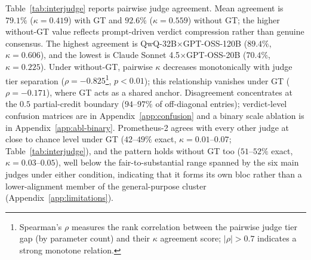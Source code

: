 Table~\ref{tab:interjudge} reports pairwise judge agreement. Mean agreement is $79.1\%$ ($\kappa=0.419$) with GT and $92.6\%$ ($\kappa=0.559$) without GT; the higher without-GT value reflects prompt-driven verdict compression rather than genuine consensus. The highest agreement is QwQ-32B$\times$GPT-OSS-120B ($89.4\%$, $\kappa=0.606$), and the lowest is Claude Sonnet 4.5$\times$GPT-OSS-20B ($70.4\%$, $\kappa=0.225$). Under without-GT, pairwise $\kappa$ decreases monotonically with judge tier separation ($\rho=-0.825$\footnote{Spearman's $\rho$ measures the rank correlation between the pairwise judge tier gap (by parameter count) and their $\kappa$ agreement score; $|\rho|>0.7$ indicates a strong monotone relation.}, $p<0.01$); this relationship vanishes under GT ($\rho=-0.171$), where GT acts as a shared anchor. Disagreement concentrates at the $0.5$ partial-credit boundary ($94$--$97\%$ of off-diagonal entries); verdict-level confusion matrices are in Appendix~\ref{app:confusion} and a binary scale ablation is in Appendix~\ref{app:abl-binary}. Prometheus-2 agrees with every other judge at close to chance level under GT ($42$--$49\%$ exact, $\kappa = 0.01$--$0.07$; Table~\ref{tab:interjudge}), and the pattern holds without GT too ($51$--$52\%$ exact, $\kappa = 0.03$--$0.05$), well below the fair-to-substantial range spanned by the six main judges under either condition, indicating that it forms its own bloc rather than a lower-alignment member of the general-purpose cluster (Appendix~\ref{app:limitations}).

